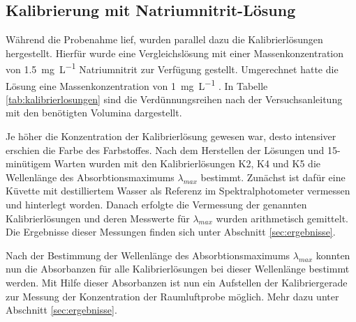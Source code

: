 \subsection*{Kalibrierung mit Natriumnitrit-Lösung}
Während die Probenahme lief, wurden parallel dazu die Kalibrierlösungen hergestellt. Hierfür wurde eine Vergleichslösung mit einer Massenkonzentration von \SI{1,5}{\milli \gram \per \liter} Natriumnitrit zur Verfügung gestellt. Umgerechnet hatte die Lösung eine Massenkonzentration von \SI{1}{\milli \gram \per \liter} . In Tabelle \ref{tab:kalibrierlosungen} sind die Verdünnungsreihen nach der Versuchsanleitung mit den benötigten Volumina dargestellt.
\vspace*{-5mm}
\begin{table}[h!]
	\renewcommand*{\arraystretch}{1.2}
	\centering
	\caption{Kalibrierlösungen}
	\label{tab:kalibrierlosungen}
\end{table}%
\FloatBarrier
Je höher die Konzentration der Kalibrierlösung gewesen war, desto intensiver erschien die Farbe des Farbstoffes.
Nach dem Herstellen der Lösungen und 15-minütigem Warten wurden mit den Kalibrierlösungen K2, K4 und K5 die Wellenlänge des Absorbtionsmaximums $\lambda_{max}$ bestimmt. Zunächst ist dafür eine Küvette mit destilliertem Wasser als Referenz im Spektralphotometer vermessen und hinterlegt worden. Danach erfolgte die Vermessung der genannten Kalibrierlösungen und deren Messwerte für $\lambda_{max}$ wurden arithmetisch gemittelt. Die Ergebnisse dieser Messungen finden sich unter Abschnitt \ref{sec:ergebnisse}.

Nach der Bestimmung der Wellenlänge des Absorbtionsmaximums $\lambda_{max}$ konnten nun die Absorbanzen für alle Kalibrierlösungen bei dieser Wellenlänge bestimmt werden. Mit Hilfe dieser Absorbanzen ist nun ein Aufstellen der Kalibriergerade zur Messung der Konzentration der Raumluftprobe möglich. Mehr dazu unter Abschnitt \ref{sec:ergebnisse}.

